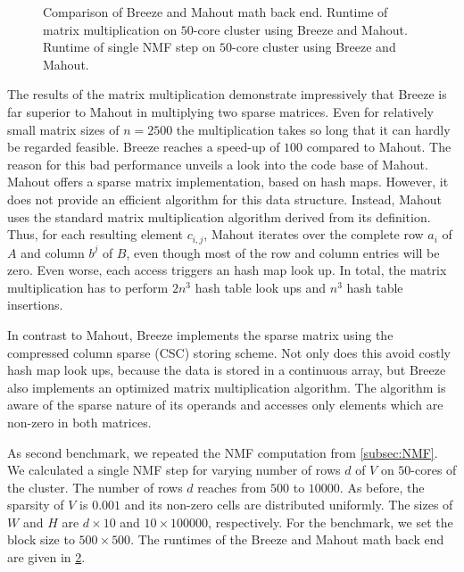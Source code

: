 \begin{figure}
\begin{subfigure}{\dualpgfwidth}
		\caption{}
		\label{subfig:nmfMathBackend}
	\end{subfigure}
	\caption{Comparison of Breeze and Mahout math back end.  Runtime of matrix multiplication on $50$-core cluster using Breeze and Mahout.  Runtime of single NMF step on $50$-core cluster using Breeze and Mahout.}
	\label{fig:nnmfLoadMathBackend}
\end{figure}

The results of the matrix multiplication demonstrate impressively that Breeze is far superior to Mahout in multiplying two sparse matrices.
Even for relatively small matrix sizes of $n=2500$ the multiplication takes so long that it can hardly be regarded feasible.
Breeze reaches a speed-up of $100$ compared to Mahout.
The reason for this bad performance unveils a look into the code base of Mahout.
Mahout offers a sparse matrix implementation, based on hash maps.
However, it does not provide an efficient algorithm for this data structure.
Instead, Mahout uses the standard matrix multiplication algorithm derived from its definition.
Thus, for each resulting element $c_{i,j}$, Mahout iterates over the complete row $a_i$ of $A$ and column $b^{j}$ of $B$, even though most of the row and column entries will be zero.
Even worse, each access triggers an hash map look up.
In total, the matrix multiplication has to perform $2n^3$ hash table look ups and $n^3$ hash table insertions.

In contrast to Mahout, Breeze implements the sparse matrix using the compressed column sparse (CSC) storing scheme.
Not only does this avoid costly hash map look ups, because the data is stored in a continuous array, but Breeze also implements an optimized matrix multiplication algorithm.
The algorithm is aware of the sparse nature of its operands and accesses only elements which are non-zero in both matrices.

As second benchmark, we repeated the NMF computation from \cref{subsec:NMF}.
We calculated a single NMF step for varying number of rows $d$ of $V$ on $50$-cores of the cluster.
The number of rows $d$ reaches from $500$ to $10000$.
As before, the sparsity of $V$ is $0.001$ and its non-zero cells are distributed uniformly.
The sizes of $W$ and $H$ are $d\times 10$ and $10 \times 100000$, respectively.
For the benchmark, we set the block size to $500 \times 500$.
The runtimes of the Breeze and Mahout math back end are given in \cref{fig:nnmfLoadMathBackend}.

